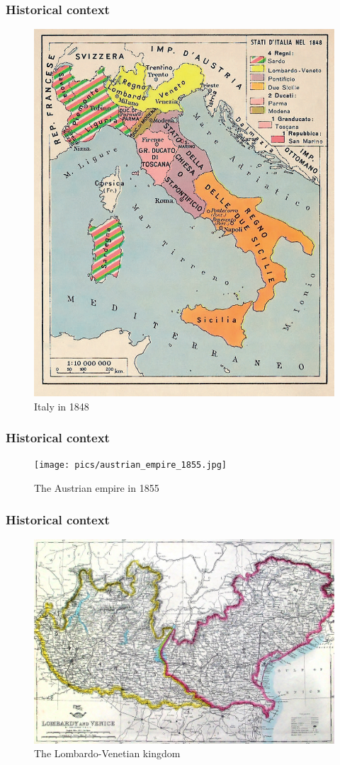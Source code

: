 \documentclass[10pt]{beamer}
\begin{document}
\begin{frame}
    \frametitle{Historical context}
    
    \begin{figure}
        \centering
        \includegraphics[width=0.5\linewidth]{pics/stati_preunitari.png}
        \caption{Italy in 1848}
        \label{fig:map_italy_1848}
    \end{figure}
    
\end{frame}

\begin{frame}
    \frametitle{Historical context}
    
    \begin{figure}
        \centering
        \texttt{[image: pics/austrian\_empire\_1855.jpg]}
        \caption{The Austrian empire in 1855}
        \label{fig:map_austria_1855}
    \end{figure}
    
\end{frame}

\begin{frame}
    \frametitle{Historical context}
    
    \begin{figure}
        \centering
        \includegraphics[width=0.75\linewidth]{pics/lombardy_venice}
        \caption{The Lombardo-Venetian kingdom}
        \label{fig:map_lombardy_venice}
    \end{figure}
    
\end{frame}
\end{document}
